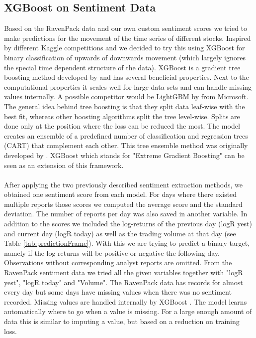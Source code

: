 \subsection{XGBoost on Sentiment Data}\label{sec:XGB}
Based on the RavenPack data and our own custom sentiment scores we tried to make predictions for the movement of the time series of different stocks. Inspired by different Kaggle competitions and \citep{li2018predicting} we decided to try this using XGBoost for binary classification of upwards of downwards movement (which largely ignores the special time dependent structure of the data). XGBoost is a gradient tree boosting method developed by \citet{Chen_2016} and has several beneficial properties. Next to the computational properties it scales well for large data sets and can handle missing values internally. A possible competitor would be LightGBM by \citet{Ke2017LightGBMAH} from Microsoft. The general idea behind tree boosting is that they split data leaf-wise with the best fit, whereas other boosting algorithms split the tree level-wise. Splits are done only at the position where the loss can be reduced the most. The model creates an ensemble of a predefined number of classification and regression trees (CART) that complement each other. This tree ensemble method was originally developed by \citet{friedman2001greedy}. XGBoost which stands for "Extreme Gradient Boosting" can be seen as an extension of this framework. \\ \\
After applying the two previously described sentiment extraction methods, we obtained one sentiment score from each model. For days where there existed multiple reports those scores we computed the average score and the standard deviation. The number of reports per day was also saved in another variable. In addition to the scores we included the log-returns of the previous day (logR yest) and current day (logR today) as well as the trading volume at that day (see Table \ref{tab:predictionFrame}). With this we are trying to predict a binary target, namely if the log-returns will be positive or negative the following day. Observations without corresponding analyst reports are omitted. 
From the RavenPack sentiment data we tried all the given variables together with "logR yest", "logR today" and "Volume". The RavenPack data has records for almost every day but some days have missing values when there was no sentiment recorded. Missing values are handled internally by XGBoost \citep{Chen_2016}. The model learns automatically where to go when a value is missing. For a large enough amount of data this is similar to imputing a value, but based on a reduction on training loss. 
